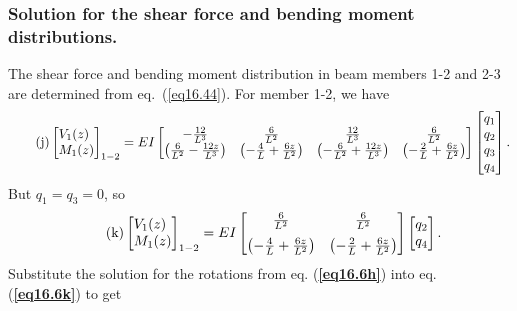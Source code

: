 \documentclass{AeroStructure-ERJohnson}
\begin{document}
\begin{example}
\subsubsection{Solution for the shear force and bending moment distributions.} The shear force and bending moment distribution in beam members 1-2 and 2-3 are determined from eq.~(\ref{eq16.44}). For member 1-2, we have
\begin{align}\label{eq16.6j}\tag{j}
\left[\begin{array}{@{}l@{}}V_{1}(z) \\M_{1}(z)\end{array}\right]_{1-2}=E I\left[\begin{array}{@{}cccc@{}}-\frac{12}{L^{3}} & \frac{6}{L^{2}} & \frac{12}{L^{3}} & \frac{6}{L^{2}} \\\left(\frac{6}{L^{2}}-\frac{12 z}{L^{3}}\right) & \left(-\frac{4}{L}+\frac{6 z}{L^{2}}\right) & \left(-\frac{6}{L^{2}}+\frac{12 z}{L^{3}}\right) & \left(-\frac{2}{L}+\frac{6 z}{L^{2}}\right)\end{array}\right]\left[\begin{array}{@{}l@{}}q_{1} \\q_{2} \\q_{3} \\q_{4}\end{array}\right].
\end{align}
But $q_{1}=q_{3}=0$, so
\begin{align}\label{eq16.6k}\tag{k}
\left[\begin{array}{@{}l@{}}V_{1}(z) \\M_{1}(z)\end{array}\right]_{1-2}=E I\left[\begin{array}{@{}cc@{}}\frac{6}{L^{2}} & \frac{6}{L^{2}} \\[6pt]\left(-\frac{4}{L}+\frac{6 z}{L^{2}}\right)&\left(-\frac{2}{L}+\frac{6 z}{L^{2}}\right)\end{array}\right]\left[\begin{array}{@{}l@{}}q_{2} \\q_{4}\end{array}\right].
\end{align}
Substitute the solution for the rotations from eq. (\textbf{\ref{eq16.6h}}) into eq. (\textbf{\ref{eq16.6k}}) to get
\begin{align}\label{eq16.6l}\tag{l}

\end{align}
\end{example}
\end{document}
